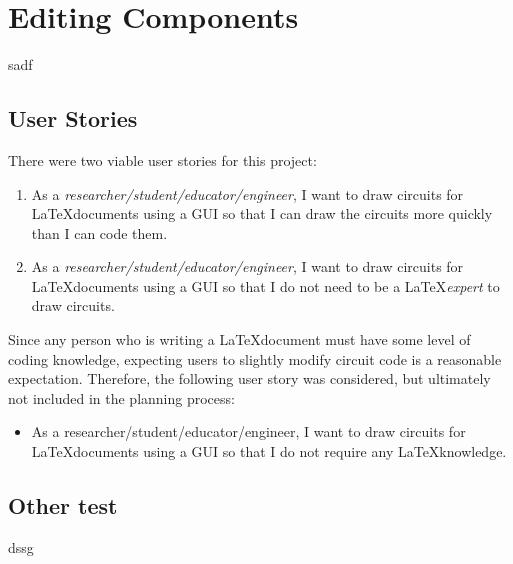 %
\chapter{Editing Components}\label{ch:editing-components}
sadf

\section{User Stories}\label{sec:user-stories}
There were two viable user stories for this project:
\begin{enumerate}
    \item As a \emph{researcher/student/educator/engineer}, I want to draw circuits for \LaTeX documents using a GUI so that I can draw the circuits more quickly than I can code them.
    \item As a \emph{researcher/student/educator/engineer}, I want to draw circuits for \LaTeX documents using a GUI so that I do not need to be a \LaTeX \emph{expert} to draw circuits.
\end{enumerate}

Since any person who is writing a \LaTeX document must have some level of coding knowledge, expecting users to slightly modify circuit code is a reasonable expectation.
Therefore, the following user story was considered, but ultimately not included in the planning process:
\begin{itemize}
    \item {\color{red}As a researcher/student/educator/engineer, I want to draw circuits for \LaTeX documents using a GUI so that I do not require any \LaTeX knowledge.}
\end{itemize}

\section{Other test}
dssg